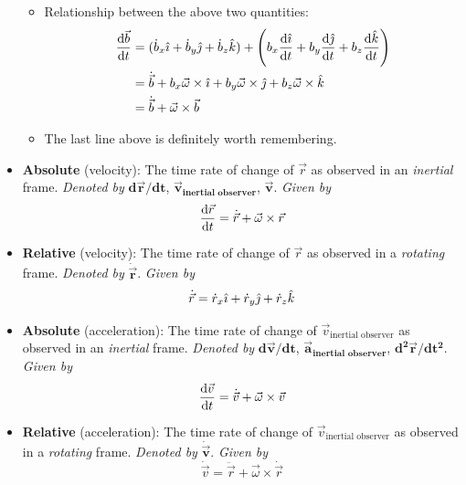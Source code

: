 \documentclass[../notes.tex]{subfiles}
\begin{document}
\begin{itemize}
\begin{itemize}
        \item Relationship between the above two quantities:
        \begin{align*}
            \dv{\vec{b}}{t} &= (\dot{b}_x\hat{\imath}+\dot{b}_y\hat{\jmath}+\dot{b}_z\hat{k})+\left( b_x\dv{\hat{\imath}}{t}+b_y\dv{\hat{\jmath}}{t}+b_z\dv{\hat{k}}{t} \right)\\
            &= \dot{\vec{b}}+b_x\vec{\omega}\times\hat{\imath}+b_y\vec{\omega}\times\hat{\jmath}+b_z\vec{\omega}\times\hat{k}\\
            &= \dot{\vec{b}}+\vec{\omega}\times\vec{b}
        \end{align*}
        \item The last line above is definitely worth remembering.
    \end{itemize}
    \item \textbf{Absolute} (velocity): The time rate of change of $\vec{r}$ as observed in an \emph{inertial} frame. \emph{Denoted by} $\bm{\textbf{d}\vec{r}/\textbf{d}t}$, $\bm{\vec{v}_\textbf{inertial observer}}$, $\bm{\vec{v}}$. \emph{Given by}
    \begin{equation*}
        \dv{\vec{r}}{t} = \dot{\vec{r}}+\vec{\omega}\times\vec{r}
    \end{equation*}
    \item \textbf{Relative} (velocity): The time rate of change of $\vec{r}$ as observed in a \emph{rotating} frame. \emph{Denoted by} $\bm{\dot{\vec{r}}}$. \emph{Given by}
    \begin{equation*}
        \dot{\vec{r}} = \dot{r}_x\hat{\imath}+\dot{r}_y\hat{\jmath}+\dot{r}_z\hat{k}
    \end{equation*}
    \item \textbf{Absolute} (acceleration): The time rate of change of $\vec{v}_\text{inertial observer}$ as observed in an \emph{inertial} frame. \emph{Denoted by} $\bm{\textbf{d}\vec{v}/\textbf{d}t}$, $\bm{\vec{a}_\textbf{inertial observer}}$, $\bm{\textbf{d}^2\vec{r}/\textbf{d}t^2}$. \emph{Given by}
    \begin{equation*}
        \dv{\vec{v}}{t} = \dot{\vec{v}}+\vec{\omega}\times\vec{v}
    \end{equation*}
    \item \textbf{Relative} (acceleration): The time rate of change of $\vec{v}_\text{inertial observer}$ as observed in a \emph{rotating} frame. \emph{Denoted by} $\bm{\dot{\vec{v}}}$. \emph{Given by}
    \begin{equation*}
        \dot{\vec{v}} = \ddot{\vec{r}}+\vec{\omega}\times\dot{\vec{r}}
    \end{equation*}

\end{itemize}
\end{document}
